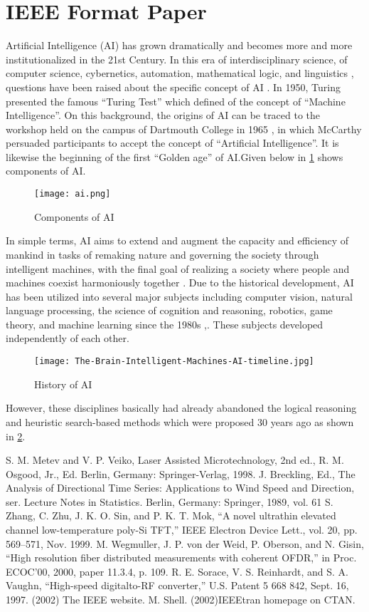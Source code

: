 \documentclass[12pt]{article}
\begin{document}
\section{IEEE Format Paper}
Artificial Intelligence (AI) has grown dramatically and becomes more and more institutionalized in the 21st Century. In this era of interdisciplinary science, of computer science, cybernetics, automation, mathematical logic, and linguistics \cite{Metev}, questions have been raised about the specific concept of AI \cite{Brekling}. In 1950, Turing \cite{Zhang} presented the famous “Turing Test” which defined of the concept of “Machine Intelligence”. On this background, the origins of AI can be traced to the workshop held on the campus of Dartmouth College in 1965 \cite{Wegmuller}, in which McCarthy persuaded participants to accept the concept of “Artificial Intelligence”. It is likewise the beginning of the first “Golden age” of AI.Given below in \ref{Fig ai1} shows components of AI.
\begin{figure}[h]
\texttt{[image: ai.png]}
\caption{Components of AI} 
\label{Fig ai1}
\end{figure} 
In simple terms, AI aims to extend and augment the capacity and efficiency of mankind in tasks of remaking nature and governing the society through intelligent machines, with the final goal of realizing a society where people and machines coexist harmoniously together \cite{Sorace}. Due to the historical development, AI has been utilized into several major subjects including computer vision, natural language processing, the science of cognition and reasoning, robotics, game theory, and machine learning since the 1980s \cite{website},\cite{Shell}. These subjects developed independently of each other.
\begin{figure}[h]
\texttt{[image: The-Brain-Intelligent-Machines-AI-timeline.jpg]} 
\caption{History of AI} 
\label{Fig ai2}
\end{figure} 
 However, these disciplines basically had already abandoned the logical reasoning and heuristic search-based methods which were proposed 30 years ago as shown in \ref{Fig ai2}.
\newpage
\begin{thebibliography}{}
 S. M. Metev and V. P. Veiko, Laser Assisted Microtechnology, 2nd ed.,
R. M. Osgood, Jr., Ed. Berlin, Germany: Springer-Verlag, 1998.
 J. Breckling, Ed., The Analysis of Directional Time Series:
Applications to Wind Speed and Direction, ser. Lecture Notes in
Statistics. Berlin, Germany: Springer, 1989, vol. 61
 S. Zhang, C. Zhu, J. K. O. Sin, and P. K. T. Mok, “A novel ultrathin
elevated channel low-temperature poly-Si TFT,” IEEE Electron Device
Lett., vol. 20, pp. 569–571, Nov. 1999.
M. Wegmuller, J. P. von der Weid, P. Oberson, and N. Gisin, “High
resolution fiber distributed measurements with coherent OFDR,” in
Proc. ECOC’00, 2000, paper 11.3.4, p. 109.
 R. E. Sorace, V. S. Reinhardt, and S. A. Vaughn, “High-speed digitalto-RF converter,” U.S. Patent 5 668 842, Sept. 16, 1997.
(2002) The IEEE website.
M. Shell. (2002)IEEEtran homepage on CTAN. 
\end{thebibliography}
\end{document}
